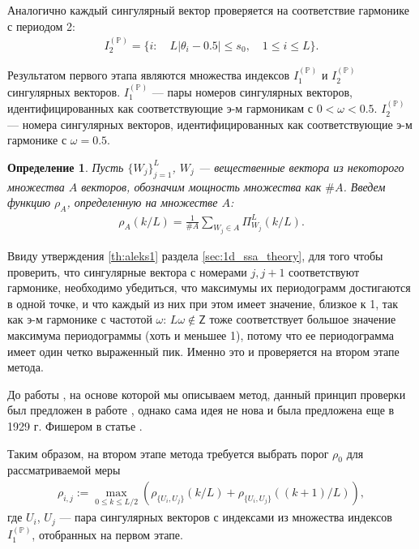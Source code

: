 \documentclass[specialist,
               substylefile = spbu.rtx,
               subf,href,colorlinks=true, 12pt]{disser}
\newtheorem{defn}{Определение}
\begin{document}
Аналогично каждый сингулярный вектор проверяется на соответствие гармонике с периодом 2:
\begin{gather} \label{eq:I_2_P}
I_2^{(\mathbb{P})} = \{i: \quad  L |\theta_{i} - 0.5 | \leqslant s_0, \quad 1 \leqslant i \leqslant L\}.
\end{gather}  

Результатом первого этапа являются множества индексов $I_1^{(\mathbb{P})}$ и $I_2^{(\mathbb{P})}$ сингулярных векторов. $I_1^{(\mathbb{P})}$ --- пары номеров сингулярных векторов, идентифицированных как соответствующие э-м гармоникам с $0 < \omega < 0.5$.  $I_2^{(\mathbb{P})}$ --- номера сингулярных векторов, идентифицированных как соответствующие э-м гармонике с $\omega = 0.5$. 

\begin{defn} \label{def:rho}
Пусть $\{W_j\}_{j=1}^{L}$, $W_j$ --- вещественные вектора из некоторого множества $A$ векторов, обозначим мощность множества как $\# A$. Введем функцию $\rho_A$, определенную на множестве $A$:
\begin{gather*}
\rho_{A}(k/L) = \frac{1}{\#A} \sum_{W_j \in A}{\Pi^{L}_{W_j}{(k/L)}}.
\end{gather*}
\end{defn}

Ввиду утверждения \ref{th:aleks1} раздела \ref{sec:1d_ssa_theory}, для того чтобы проверить, что сингулярные вектора с номерами $j, j + 1$ соответствуют гармонике, необходимо убедиться, что максимумы их периодограмм достигаются в одной точке, и что каждый из них при этом имеет значение, близкое к 1, так как э-м гармонике с частотой $\omega$: $L \omega \not \in \mathsf{Z}$ тоже соответствует большое значение максимума периодограммы (хоть и меньшее 1), потому что ее периодограмма имеет один четко выраженный пик.  Именно это и проверяется на втором этапе метода.

До работы \cite{Alexandrov2006}, на основе которой мы описываем метод, данный принцип проверки был предложен в работе \cite{Vautard1992}, однако сама идея не нова и была предложена еще в 1929 г. Фишером в статье \cite{Fisher1929}.

Таким образом, на втором этапе метода 
 требуется выбрать порог $\rho_0$ для рассматриваемой меры 
\begin{gather} \label{eq:rho_ij}
\rho_{i,j} := \max_{0 \leqslant k \leqslant L/2}{\left(\rho_{\{U_i,U_j\}}(k/L) + \rho_{\{U_i,U_j\}}((k+1)/L)\right)},
\end{gather}
где $U_i$, $U_j$ --- пара сингулярных векторов с индексами из множества индексов $I_1^{(\mathbb{P})}$, отобранных на первом этапе. 
\end{document}
